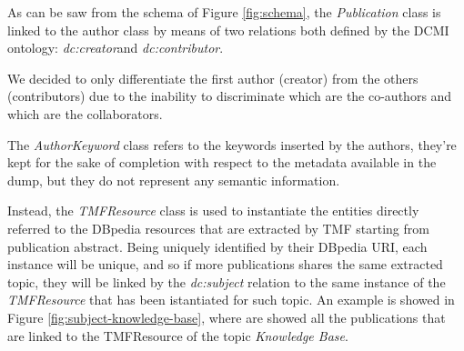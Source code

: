 \documentclass[%
    corpo=13.5pt,
    twoside,
    oldstyle,
    tipotesi=magistrale,
    greek,
    evenboxes
]{toptesi}
\begin{document}
As can be saw from the schema of Figure \ref{fig:schema}, the \emph{Publication}
class is linked to the author class by means of two relations both defined by
the DCMI ontology:
\emph{dc:creator}\footnotemark and \emph{dc:contributor}\footnotemark[\value{footnote}].

We decided to only differentiate the first author (creator) from
the others (contributors) due to the inability to discriminate which are the
co-authors and which are the collaborators.

The \emph{AuthorKeyword} class refers to the keywords inserted by the authors,
they're kept for the sake of completion with respect to the metadata available
in the dump, but they do not represent any semantic information.

Instead, the \emph{TMFResource} class is used to instantiate the entities
directly referred to the DBpedia resources that are extracted by TMF starting
from publication abstract. Being
uniquely identified by their DBpedia URI, each instance will be unique, and so
if more publications shares the same extracted topic, they will be linked
by the \emph{dc:subject} relation to the same instance of the
\emph{TMFResource} that has been istantiated for such topic. An example is
showed in Figure \ref{fig:subject-knowledge-base}, where are showed all the
publications that are linked to the TMFResource of the
topic \emph{Knowledge Base}.
\end{document}
